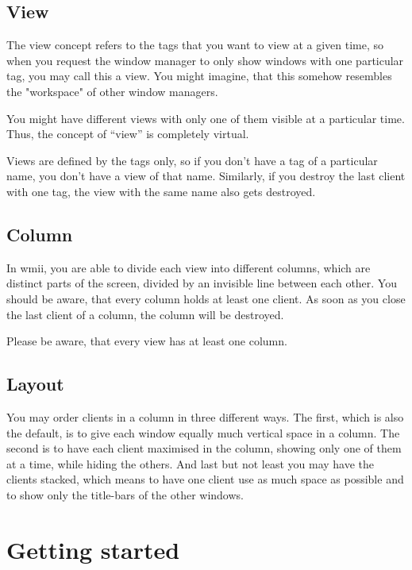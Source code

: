 \documentclass[12pt,a4paper]{article} %
\begin{document}
  \subsection{View}

    The view concept refers to the tags that you want to view at a
    given time, so when you request the window manager to only show
    windows with one particular tag, you may call this a view. You
    might imagine, that this somehow resembles the "workspace" of
    other window managers.

    You might have different views with only one of them visible at a
    particular time. Thus, the concept of ``view'' is completely
    virtual.

    Views are defined by the tags only, so if you don't have a tag of
    a particular name, you don't have a view of that name.  Similarly,
    if you destroy the last client with one tag, the view with the
    same name also gets destroyed.

  \subsection{Column}

    In wmii, you are able to divide each view into different columns,
    which are distinct parts of the screen, divided by an invisible
    line between each other. You should be aware, that every column
    holds at least one client. As soon as you close the last client of
    a column, the column will be destroyed.

    Please be aware, that every view has at least one column.

  \subsection{Layout}

    You may order clients in a column in three different ways. The
    first, which is also the default, is to give each window equally
    much vertical space in a column. The second is to have each client
    maximised in the column, showing only one of them at a time, while
    hiding the others. And last but not least you may have the clients
    stacked, which means to have one client use as much space as
    possible and to show only the title-bars of the other windows.

\section{Getting started}
\end{document}
